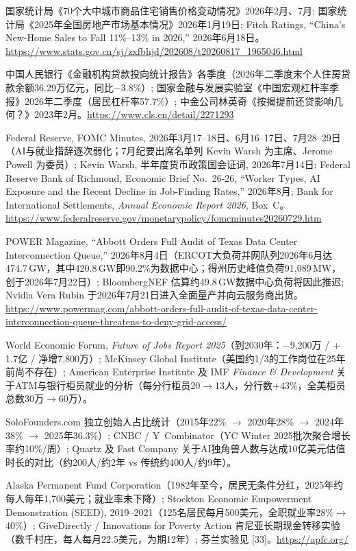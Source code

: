 \documentclass[11pt,a4paper]{ctexart}
\begin{document}
\noindent [120] 国家统计局《70个大中城市商品住宅销售价格变动情况》2026年2月、7月; 国家统计局《2025年全国房地产市场基本情况》2026年1月19日; Fitch Ratings, ``China's New-Home Sales to Fall 11\%--13\% in 2026,'' 2026年6月18日。\url{https://www.stats.gov.cn/sj/zxfbhjd/202608/t20260817_1965046.html}

\noindent [121] 中国人民银行《金融机构贷款投向统计报告》各季度（2026年二季度末个人住房贷款余额36.29万亿元，同比$-$3.8\%）; 国家金融与发展实验室《中国宏观杠杆率季报》2026年二季度（居民杠杆率57.7\%）; 中金公司林英奇《按揭提前还贷影响几何？》2023年2月。\url{https://www.cls.cn/detail/2271293}

\noindent [122] Federal Reserve, FOMC Minutes, 2026年3月17--18日、6月16--17日、7月28--29日（AI与就业措辞逐次弱化；7月纪要出席名单列 Kevin Warsh 为主席、Jerome Powell 为委员）; Kevin Warsh, 半年度货币政策国会证词, 2026年7月14日; Federal Reserve Bank of Richmond, Economic Brief No.~26-26, ``Worker Types, AI Exposure and the Recent Decline in Job-Finding Rates,'' 2026年8月; Bank for International Settlements, \emph{Annual Economic Report 2026}, Box~C。\url{https://www.federalreserve.gov/monetarypolicy/fomcminutes20260729.htm}

\noindent [123] POWER Magazine, ``Abbott Orders Full Audit of Texas Data Center Interconnection Queue,'' 2026年8月4日（ERCOT大负荷并网队列2026年6月达474.7\,GW，其中420.8\,GW即90.2\%为数据中心；得州历史峰值负荷91,089\,MW，创于2026年7月22日）; BloombergNEF 估算约49.8\,GW数据中心负荷将因此推迟; Nvidia Vera Rubin 于2026年7月21日进入全面量产并向云服务商出货。\url{https://www.powermag.com/abbott-orders-full-audit-of-texas-data-center-interconnection-queue-threatens-to-deny-grid-access/}

\noindent [124] World Economic Forum, \emph{Future of Jobs Report 2025}（到2030年：$-$9,200万 / $+$1.7亿 / 净增7,800万）; McKinsey Global Institute（美国约1/3的工作岗位在25年前尚不存在）; American Enterprise Institute 及 IMF \emph{Finance \& Development} 关于ATM与银行柜员就业的分析（每分行柜员20$\to$13人，分行数$+$43\%，全美柜员总数30万$\to$60万）。

\noindent [125] SoloFounders.com 独立创始人占比统计（2015年22\% $\to$ 2020年28\% $\to$ 2024年38\% $\to$ 2025年36.3\%）; CNBC / Y~Combinator（YC Winter 2025批次聚合增长率约10\%/周）; Quartz 及 Fast Company 关于AI独角兽人数与达成10亿美元估值时长的对比（约200人/约2年 vs 传统约400人/约9年）。

\noindent [126] Alaska Permanent Fund Corporation（1982年至今，居民无条件分红，2025年约每人每年1,700美元；就业率未下降）; Stockton Economic Empowerment Demonstration (SEED), 2019--2021（125名居民每月500美元，全职就业率28\%$\to$40\%）; GiveDirectly / Innovations for Poverty Action 肯尼亚长期现金转移实验（数千村庄，每人每月22.5美元，为期12年）; 芬兰实验见 [33]。\url{https://apfc.org/}
\end{document}
